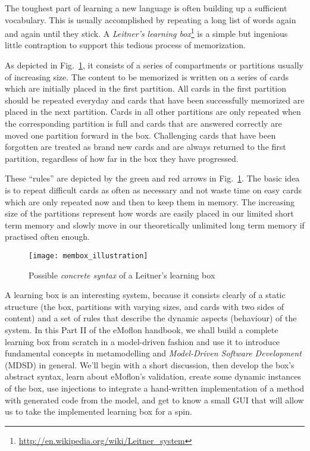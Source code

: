 \genHeader


\downloadLocation{\dlPartTwo}

The toughest part of learning a new language  is often building up a sufficient vocabulary. This is usually accomplished by repeating a long list of words again
and again until they stick. A \emph{Leitner's learning box}\footnote{\url{http://en.wikipedia.org/wiki/Leitner_system}} is a simple but ingenious little
contraption to support this tedious process of memorization.

As depicted in Fig.~\ref{fig:membox_illustration}, it consists of a series of compartments or partitions usually of increasing size. The content to be memorized
is written on a series of cards  which are initially placed in the first partition. All cards in the first  partition should be repeated everyday and cards that
have been successfully memorized are placed in the next partition. Cards in all other partitions are only repeated when the corresponding partition is full and
cards that are answered correctly are moved one partition forward in the box. Challenging cards that have been forgotten are treated as brand new cards and
are always returned to the first partition, regardless of how far in the box they have progressed.

These ``rules'' are depicted by the green and red arrows in Fig.~\ref{fig:membox_illustration}. The basic idea is to repeat difficult cards as often as
necessary and not waste time on easy cards which are only repeated now and then to keep them in memory. The increasing size of the partitions represent how
words are easily placed in our limited short term memory and slowly move in our theoretically unlimited long term memory if practised often enough.

 \begin{figure}[htp]
 \begin{center}
   \texttt{[image: membox\_illustration]}
   \caption[]{Possible \emph{concrete syntax} of a Leitner's learning box}
   \label{fig:membox_illustration}
 \end{center}
 \end{figure}
 \FloatBarrier

A learning box is an interesting system, because it consists clearly of a static structure (the box, partitions with varying sizes, and cards with two sides
of content) and a set of rules that describe the dynamic aspects (behaviour) of the system. In this Part II of the eMoflon handbook,
we shall build a complete learning box from scratch in a model-driven fashion and use it to introduce fundamental concepts in metamodelling and \emph{Model-Driven Software 
Development} (MDSD) in general. We'll begin with a short discussion, then develop the box's abstract syntax, learn about eMoflon's validation, create
some dynamic instances of the box, use injections to integrate a hand-written implementation of a method with generated code from the model, and get to know a
small GUI that will allow us to take the implemented learning box for a spin.
